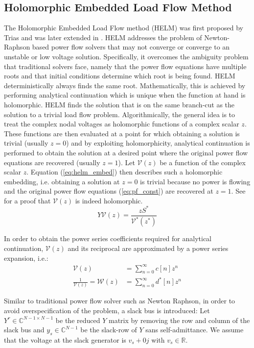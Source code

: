 \subsection{Holomorphic Embedded Load Flow Method}
\label{sec:helm}
The Holomorphic Embedded Load Flow method (HELM) was first proposed by Trias \cite{trias2012holomorphic,trias2015fundamentals} and was later extended in \cite{subramanian2013pv,wallace2016alternative}. HELM addresses the problem of Newton-Raphson based power flow solvers that may not converge or converge to an unstable or low voltage solution. Specifically, it overcomes the ambiguity problem that traditional solvers face, namely that the power flow equations have multiple roots and that initial conditions determine which root is being found. HELM deterministically always finds the same root. Mathematically, this is achieved by performing analytical continuation which is unique when the function at hand is holomorphic.  HELM finds the solution that is on the same branch-cut as the solution to a trivial load flow problem. Algorithmically, the general idea is to treat the complex nodal voltages as holomorphic functions of a complex scalar $z$. These functions are then evaluated at a point for which obtaining a solution is trivial (usually $z=0$) and by exploiting holomorphicity, analytical continuation is performed to obtain the solution at a desired point where the original power flow equations are recovered (usually $z = 1$). Let $\mathcal{V}(z)$ be a function of the complex scalar $z$. Equation (\ref{eq:helm_embed}) then describes such a holomorphic embedding, i.e. obtaining a solution at $z = 0$ is trivial because no power is flowing and the original power flow equations (\ref{eq:pf_const}) are recovered at $z = 1$. See \cite{wallace2016alternative} for a proof that $\mathcal{V}(z)$ is indeed holomorphic.
\begin{equation}
Y\mathcal{V}(z) = \frac{zS^*}{\mathcal{V}^*(z^*)} \label{eq:helm_embed}
\end{equation}

In order to obtain the power series coefficients required for analytical continuation, $\mathcal{V}(z)$ and its reciprocal are approximated by a power series expansion, i.e.:
\begin{align}
\mathcal{V}(z) &= \sum_{n=0}^\infty c[n]z^n \label{eq:power_series}\\
\frac{1}{\mathcal{V}(z)} = \mathcal{W}(z) &= \sum_{n=0}^\infty d^*[n]z^n
\end{align}

Similar to traditional power flow solver such as Newton Raphson, in order to avoid overspecification of the problem, a slack bus is introduced: Let $Y^r \in \mathbb{C}^{N-1 \times N-1}$ be the reduced $Y$ matrix by removing the row and column of the slack bus and $y_s \in \mathbb{C}^{N-1}$ be the slack-row of $Y$ sans self-admittance. We assume that the voltage at the slack generator is $v_s + 0j$ with $v_s \in \mathbb{R}$.\\

